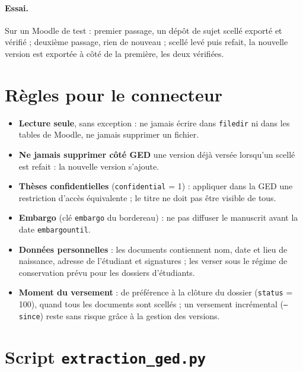 \documentclass[11pt,a4paper]{article}
\begin{document}
\paragraph{Essai.} Sur un Moodle de test : premier passage, un dépôt de sujet scellé exporté et vérifié ;
deuxième passage, rien de nouveau ; scellé levé puis refait, la nouvelle version est exportée à côté de
la première, les deux vérifiées.

\section{Règles pour le connecteur}\label{sec:regles}

\begin{itemize}
  \item \textbf{Lecture seule}, sans exception : ne jamais écrire dans \texttt{filedir} ni dans les
        tables de Moodle, ne jamais supprimer un fichier.
  \item \textbf{Ne jamais supprimer côté GED} une version déjà versée lorsqu'un scellé est refait :
        la nouvelle version s'ajoute.
  \item \textbf{Thèses confidentielles} (\texttt{confidential} = 1) : appliquer dans la GED une
        restriction d'accès équivalente ; le titre ne doit pas être visible de tous.
  \item \textbf{Embargo} (clé \texttt{embargo} du bordereau) : ne pas diffuser le manuscrit avant la
        date \texttt{embargountil}.
  \item \textbf{Données personnelles} : les documents contiennent nom, date et lieu de naissance,
        adresse de l'étudiant et signatures ; les verser sous le régime de conservation prévu pour les
        dossiers d'étudiants.
  \item \textbf{Moment du versement} : de préférence à la clôture du dossier (\texttt{status} = 100),
        quand tous les documents sont scellés ; un versement incrémental (\texttt{--since}) reste sans
        risque grâce à la gestion des versions.
\end{itemize}

\appendix
\section{Script \texttt{extraction\_ged.py}}

\end{document}
